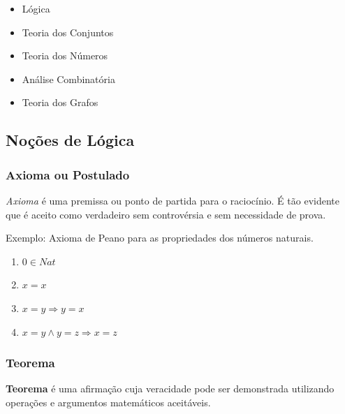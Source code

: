 \begin{itemize}
\item
  Lógica
\item
  Teoria dos Conjuntos
\item
  Teoria dos Números
\item
  Análise Combinatória
\item
  Teoria dos Grafos
\end{itemize}

    \hypertarget{nouxe7uxf5es-de-luxf3gica}{%
\subsection{Noções de Lógica}\label{nouxe7uxf5es-de-luxf3gica}}

\hypertarget{axioma-ou-postulado}{%
\subsubsection{Axioma ou Postulado}\label{axioma-ou-postulado}}

\emph{Axioma} é uma premissa ou ponto de partida para o raciocínio. É
tão evidente que é aceito como verdadeiro sem controvérsia e sem
necessidade de prova.

Exemplo: Axioma de Peano para as propriedades dos números naturais.

\begin{enumerate}
\def\labelenumi{\arabic{enumi}.}
\item
  \(0 \in Nat\)
\item
  \(x=x\)
\item
  \(x=y \Rightarrow y=x\)
\item
  \(x=y\wedge y=z\Rightarrow x=z\)
\end{enumerate}

    \hypertarget{teorema}{%
\subsubsection{Teorema}\label{teorema}}

\textbf{Teorema} é uma afirmação cuja veracidade pode ser demonstrada
utilizando operações e argumentos matemáticos aceitáveis.

